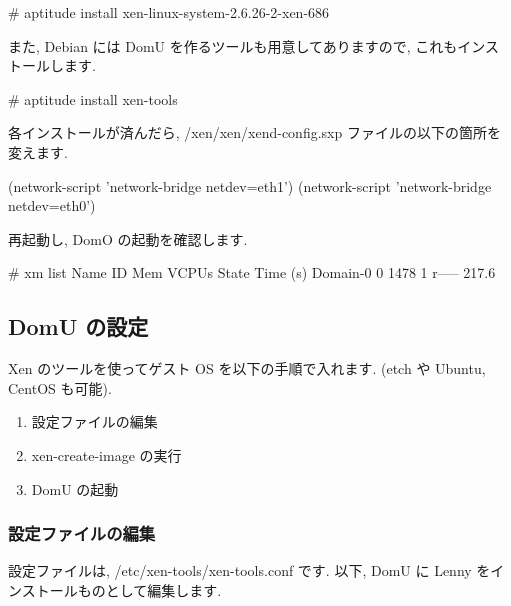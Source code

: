 \documentclass[mingoth,a4paper]{jsarticle}
\begin{document}
\begin{commandline}
# aptitude install xen-linux-system-2.6.26-2-xen-686 
\end{commandline}
また, Debian には DomU を作るツールも用意してありますので, これもインストールします.
\begin{commandline}
# aptitude install xen-tools
\end{commandline}
各インストールが済んだら, /xen/xen/xend-config.sxp ファイルの以下の箇所を変えます.
\begin{commandline}
(network-script 'network-bridge netdev=eth1')
(network-script 'network-bridge netdev=eth0')
\end{commandline}
再起動し, DomO の起動を確認します.
\begin{commandline}
# xm list
Name                 ID   Mem  VCPUs   State   Time (s)
Domain-0             0   1478     1   r-----    217.6
\end{commandline}

\subsection{DomU の設定}
Xen のツールを使ってゲスト OS を以下の手順で入れます. (etch や Ubuntu, CentOS も可能).
\begin{enumerate}
\item 設定ファイルの編集
\item xen-create-image の実行
\item DomU の起動
\end{enumerate}

\subsubsection{設定ファイルの編集}
設定ファイルは, /etc/xen-tools/xen-tools.conf です. 以下, DomU に Lenny をインストールものとして編集します.
\end{document}
